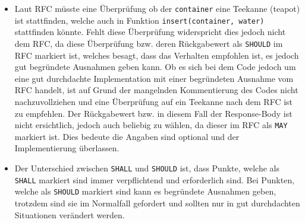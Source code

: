 \documentclass[german,12pt,a4paper]{article}
\begin{document}
\begin{itemize}

	\item Laut RFC müsste eine Überprüfung ob der \texttt{container} eine Teekanne (teapot) ist
	stattfinden, welche auch in Funktion \texttt{insert(container, water)} stattfinden könnte. Fehlt
	diese Überprüfung widerspricht dies jedoch nicht dem RFC, da diese Überprüfung bzw. deren
	Rückgabewert als \texttt{SHOULD} im RFC markiert ist, welches besagt, dass das Verhalten
	empfohlen ist, es jedoch gut begründete Ausnahmen geben kann. Ob es sich bei dem Code jedoch um
	eine gut durchdachte Implementation mit einer begründeten Ausnahme vom RFC handelt, ist auf Grund
	der mangelnden Kommentierung des Codes nicht nachzuvollziehen und eine Überprüfung auf ein
	Teekanne nach dem RFC ist zu empfehlen. Der Rückgabewert bzw. in diesem Fall der Response-Body
	ist nicht ersichtlich, jedoch auch beliebig zu wählen, da dieser im RFC als \texttt{MAY} markiert
	ist. Dies bedeute die Angaben sind optional und der Implementierung überlassen.

	\item Der Unterschied zwischen \texttt{SHALL} und \texttt{SHOULD} ist, dass Punkte, welche als
	\texttt{SHALL} markiert sind immer verpflichtend und erforderlich sind. Bei Punkten, welche als
	\texttt{SHOULD} markiert sind kann es begründete Ausnahmen geben, trotzdem sind sie im Normalfall
	gefordert und sollten nur in gut durchdachten Situationen verändert werden.

\end{itemize}
\end{document}
